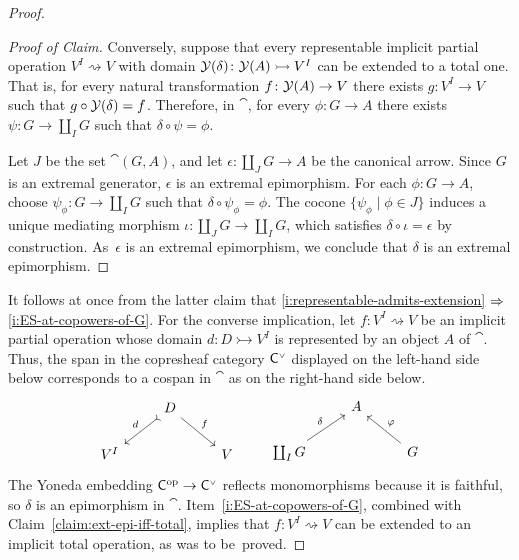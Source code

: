 \documentclass[a4paper,10pt,reqno]{amsart}
\theoremstyle{definition}
\theoremstyle{remark}
\begin{document}
\begin{proof}
\begin{proof}[Proof of Claim]
Conversely, suppose that every representable implicit partial operation $V^{I} \rightsquigarrow V$ with domain $\mathcal{Y}(\delta)\colon \mathcal{Y}(A)\rightarrowtail V^{I}$ can be extended to a total one. That is, for every natural transformation $f\colon \mathcal{Y}(A)\to V$ there exists $g\colon V^{I}\to V$ such that $g\circ \mathcal{Y}(\delta) = f$. Therefore, in $\cat$, for every $\phi\colon G\to A$ there exists $\psi\colon G\to \coprod_{I}G$ such that $\delta\circ \psi = \phi$. 

Let $J$ be the set $\cat(G,A)$, and let $\epsilon\colon \coprod_{J}G \to A$ be the canonical arrow. Since $G$ is an extremal generator, $\epsilon$ is an extremal epimorphism. For each $\phi\colon G \to A$, choose $\psi_{\phi}\colon G\to \coprod_{I}G$ such that $\delta\circ \psi_{\phi} = \phi$. The cocone $\{\psi_{\phi}\mid \phi\in J\}$ induces a unique mediating morphism $\iota\colon \coprod_{J}G \to \coprod_{I}G$, which satisfies $\delta\circ \iota = \epsilon$ by construction. As~$\epsilon$ is an extremal epimorphism, we conclude that $\delta$ is an extremal epimorphism. 
\end{proof}
%
It follows at once from the latter claim that \ref{i:representable-admits-extension} $\Rightarrow$ \ref{i:ES-at-copowers-of-G}.
%
For the converse implication, let $f\colon V^{I}\rightsquigarrow V$ be an implicit partial operation whose domain $d\colon D\rightarrowtail V^{I}$ is represented by an object $A$ of $\cat$. 
%
Thus, the span in the copresheaf category ${{\sf C}}^{\text{\tiny$\vee$}}$ displayed on the left-hand side below corresponds to a cospan in $\cat$ as on the right-hand side below.
\begin{equation*}
\begin{tikzcd}
& D \arrow[rightarrowtail]{dl}[swap]{d} \arrow{dr}{f} & \\
V^{I} & & V
\end{tikzcd}
\ \ \ \ \ \ 
\begin{tikzcd}
& A  & \\
\coprod_{I}{G} \arrow{ur}{\delta} & & G \arrow{ul}[swap]{\phi}
\end{tikzcd}
\end{equation*}
%
The Yoneda embedding ${\sf C}^{{\mathrm{op}}}\to {{\sf C}}^{\text{\tiny$\vee$}}$ reflects monomorphisms because it is faithful, so $\delta$ is an epimorphism in $\cat$. Item~\ref{i:ES-at-copowers-of-G}, combined with Claim~\ref{claim:ext-epi-iff-total}, implies that $f\colon V^{I}\rightsquigarrow V$ can be extended to an implicit total operation, as was to be~proved.
\end{proof}
\end{document}
